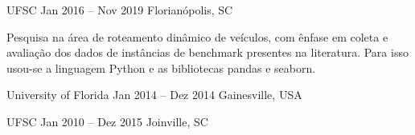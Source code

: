 
        {UFSC}
        {Jan 2016 -- Nov 2019}
        {Florianópolis, SC}

Pesquisa na área de roteamento dinâmico de veículos, com ênfase em coleta
e avaliação dos dados de instâncias de benchmark presentes na literatura.
Para isso usou-se a linguagem Python e as bibliotecas pandas e seaborn.

\divider

        {University of Florida}
        {Jan 2014 -- Dez 2014}
        {Gainesville, USA}
        
\divider

        {UFSC}
        {Jan 2010 -- Dez 2015}
        {Joinville, SC}
        
        
        
        
        

\divider

\divider









\divider



\divider

\cvtag{\LaTeX}



